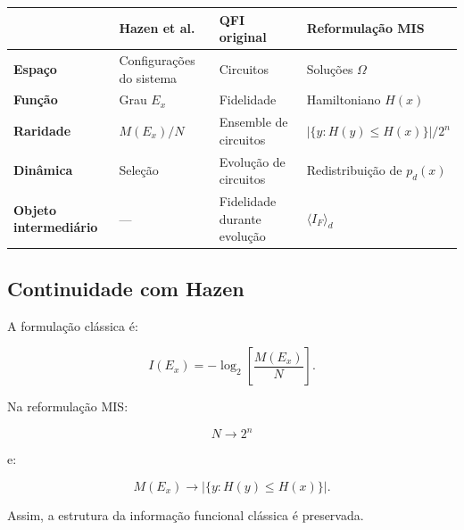 \documentclass[11pt,a4paper]{article}
\begin{document}
\renewcommand{\arraystretch}{1.4}

\begin{center}

\small

\begin{tabularx}{\textwidth}{
    >{\bfseries}p{2.5cm}
    X
    X
    X
}

\toprule

&
\textbf{Hazen et al.}
&
\textbf{QFI original}
&
\textbf{Reformulação MIS}
\\

\midrule

Espaço
&
Configurações do sistema
&
Circuitos
&
Soluções $\Omega$
\\

Função
&
Grau $E_x$
&
Fidelidade
&
Hamiltoniano $H(x)$
\\

Raridade
&
$M(E_x)/N$
&
Ensemble de circuitos
&
$|\{y:H(y)\leq H(x)\}|/2^n$
\\

Dinâmica
&
Seleção
&
Evolução de circuitos
&
Redistribuição de $p_d(x)$
\\

Objeto intermediário
&
---
&
Fidelidade durante evolução
&
$\langle I_F\rangle_d$
\\

\bottomrule

\end{tabularx}

\end{center}

\subsection{Continuidade com Hazen}

A formulação clássica é:

\[
I(E_x)
=
-\log_2
\left[
\frac{
M(E_x)
}{
N
}
\right].
\]

Na reformulação MIS:

\[
N
\longrightarrow
2^n
\]

e:

\[
M(E_x)
\longrightarrow
|\{y:H(y)\leq H(x)\}|.
\]

Assim, a estrutura da informação funcional clássica é preservada.

\end{document}
